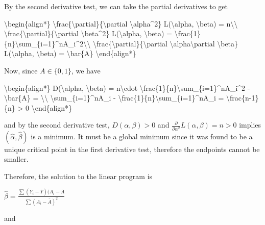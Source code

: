 \documentclass[
  11pt,
  letterpaper,
  DIV=11,
  numbers=noendperiod]{scrartcl}
\newenvironment{Shaded}{}{}
\newcommand{\NormalTok}[1]{\textcolor[rgb]{0.24,0.22,0.21}{#1}}
\begin{document}
By the second derivative test, we can take the partial derivatives to
get

\begin{Shaded}
\begin{Highlighting}[]
\NormalTok{\textbackslash{}begin\{align*\}}
\NormalTok{\textbackslash{}frac\{\textbackslash{}partial\}\{\textbackslash{}partial \textbackslash{}alpha\^{}2\} L(\textbackslash{}alpha, \textbackslash{}beta) = n\textbackslash{}\textbackslash{}}
\NormalTok{\textbackslash{}frac\{\textbackslash{}partial\}\{\textbackslash{}partial \textbackslash{}beta\^{}2\} L(\textbackslash{}alpha, \textbackslash{}beta) = \textbackslash{}frac\{1\}\{n\}\textbackslash{}sum\_\{i=1\}\^{}nA\_i\^{}2\textbackslash{}\textbackslash{}}
\NormalTok{\textbackslash{}frac\{\textbackslash{}partial\}\{\textbackslash{}partial \textbackslash{}alpha\textbackslash{}partial \textbackslash{}beta\} L(\textbackslash{}alpha, \textbackslash{}beta) = \textbackslash{}bar\{A\}}
\NormalTok{\textbackslash{}end\{align*\}}
\end{Highlighting}
\end{Shaded}

Now, since \(A \in \{0, 1\}\), we have

\begin{Shaded}
\begin{Highlighting}[]
\NormalTok{\textbackslash{}begin\{align*\}}
\NormalTok{D(\textbackslash{}alpha, \textbackslash{}beta) = n\textbackslash{}cdot \textbackslash{}frac\{1\}\{n\}\textbackslash{}sum\_\{i=1\}\^{}nA\_i\^{}2 {-} \textbackslash{}bar\{A\} = \textbackslash{}\textbackslash{}}
\NormalTok{\textbackslash{}sum\_\{i=1\}\^{}nA\_i {-} \textbackslash{}frac\{1\}\{n\}\textbackslash{}sum\_\{i=1\}\^{}nA\_i = \textbackslash{}frac\{n{-}1\}\{n\} \textgreater{} 0}
\NormalTok{\textbackslash{}end\{align*\}}
\end{Highlighting}
\end{Shaded}

and by the second derivative test, \(D(\alpha, \beta) > 0\) and
\(\frac{\partial}{\partial \alpha^2} L(\alpha, \beta) = n > 0\) implies
\((\hat{\alpha}, \hat{\beta})\) is a minimum. It must be a global
minimum since it was found to be a unique critical point in the first
derivative test, therefore the endpoints cannot be smaller.

Therefore, the solution to the linear program is

\(\hat{\beta} = \frac{\sum(Y_i - \bar{Y})(A_i - \bar{A}}{\sum(A_i - \bar{A})^2}\)

and
\end{document}
